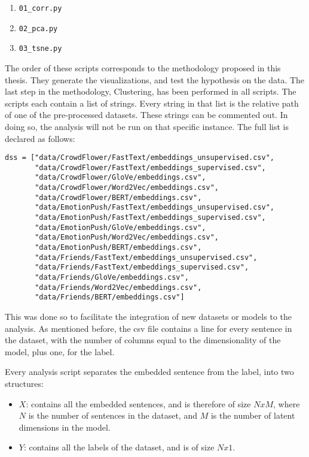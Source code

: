 \begin{enumerate}
  \item \lstinline{01_corr.py}
  \item \lstinline{02_pca.py}
  \item \lstinline{03_tsne.py}
\end{enumerate}

The order of these scripts corresponds to the methodology proposed in this thesis. They generate the visualizations, and test the hypothesis on the data. The last step in the methodology, Clustering, has been performed in all scripts. The scripts each contain a list of strings. Every string in that list is the relative path of one of the pre-processed datasets. These strings can be commented out. In doing so, the analysis will not be run on that specific instance. The full list is declared as follows:

\begin{lstlisting}[caption={Pre-processed datasets},label=lst:datasets,frame=single]
dss = ["data/CrowdFlower/FastText/embeddings_unsupervised.csv",
       "data/CrowdFlower/FastText/embeddings_supervised.csv",
       "data/CrowdFlower/GloVe/embeddings.csv",
       "data/CrowdFlower/Word2Vec/embeddings.csv",
       "data/CrowdFlower/BERT/embeddings.csv",
       "data/EmotionPush/FastText/embeddings_unsupervised.csv",
       "data/EmotionPush/FastText/embeddings_supervised.csv",
       "data/EmotionPush/GloVe/embeddings.csv",
       "data/EmotionPush/Word2Vec/embeddings.csv",
       "data/EmotionPush/BERT/embeddings.csv",
       "data/Friends/FastText/embeddings_unsupervised.csv",
       "data/Friends/FastText/embeddings_supervised.csv",
       "data/Friends/GloVe/embeddings.csv",
       "data/Friends/Word2Vec/embeddings.csv",
       "data/Friends/BERT/embeddings.csv"]
\end{lstlisting}

This was done so to facilitate the integration of new datasets or models to the analysis.
As mentioned before, the csv file contains a line for every sentence in the dataset, with the number of columns equal to the dimensionality of the model, plus one, for the label.

Every analysis script separates the embedded sentence from the label, into two structures:

\begin{itemize}
  \item $X$: contains all the embedded sentences, and is therefore of size $NxM$, where $N$ is the number of sentences in the dataset, and $M$ is the number of latent dimensions in the model.
  \item $Y$: contains all the labels of the dataset, and is of size $Nx1$.
\end{itemize}

